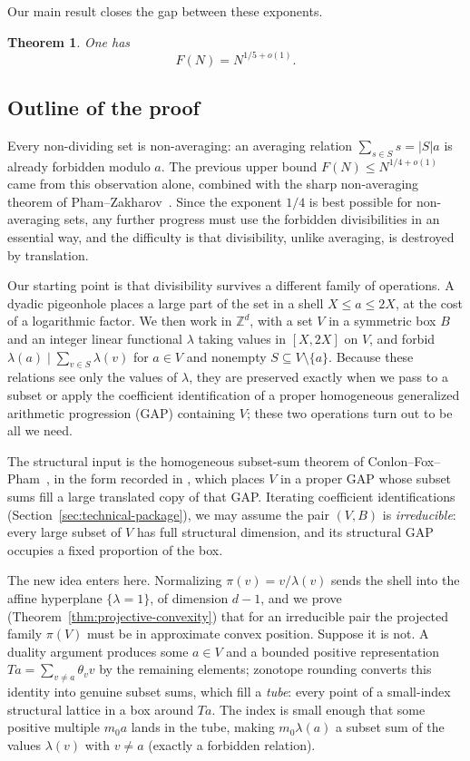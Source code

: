 \documentclass[11pt,reqno]{amsart}
\newtheorem{theorem}{Theorem}[section]
\theoremstyle{definition}
\theoremstyle{remark}
\newcommand{\Z}{\mathbb Z}
\begin{document}
Our main result closes the gap between these exponents.

\begin{theorem}\label{thm:main}
One has
\[
 F(N)=N^{1/5+o(1)}.
\]
\end{theorem}

\subsection{Outline of the proof}

Every non-dividing set is non-averaging: an averaging relation
$\sum_{s\in S}s=|S|a$ is already forbidden modulo $a$.  The previous
upper bound $F(N)\le N^{1/4+o(1)}$ came from this observation alone,
combined with the sharp non-averaging theorem of
Pham--Zakharov~\cite{PhamZakharov}.  Since the exponent $1/4$ is best
possible for non-averaging sets, any further progress must use the
forbidden divisibilities in an essential way, and the difficulty is
that divisibility, unlike averaging, is destroyed by translation.

Our starting point is that divisibility survives a different family of
operations.  A dyadic pigeonhole places a large part of the set in a
shell $X\le a\le2X$, at the cost of a logarithmic factor.  We then work
in $\Z^d$, with a set $V$ in a symmetric box $B$ and an integer linear
functional $\lambda$ taking values in $[X,2X]$ on $V$, and forbid
$\lambda(a)\mid\sum_{v\in S}\lambda(v)$ for $a\in V$ and nonempty
$S\subseteq V\setminus\{a\}$.  Because these relations see only the
values of $\lambda$, they are preserved exactly when we pass to a subset
or apply the coefficient identification of a proper homogeneous
generalized arithmetic progression (GAP) containing $V$; these two
operations turn out to be all we need.

The structural input is the homogeneous subset-sum theorem of
Conlon--Fox--Pham~\cite{CFPHomogeneous}, in the form recorded in
\cite{PhamZakharov}, which places $V$ in a proper GAP whose subset sums
fill a large translated copy of that GAP.  Iterating coefficient
identifications (Section~\ref{sec:technical-package}), we may assume the
pair $(V,B)$ is \emph{irreducible}: every large subset of $V$ has full
structural dimension, and its structural GAP occupies a fixed proportion
of the box.

The new idea enters here.  Normalizing $\pi(v)=v/\lambda(v)$ sends the
shell into the affine hyperplane $\{\lambda=1\}$, of dimension $d-1$,
and we prove (Theorem~\ref{thm:projective-convexity}) that for an
irreducible pair the projected family $\pi(V)$ must be in approximate
convex position.  Suppose it is not.  A duality argument produces some
$a\in V$ and a bounded positive representation
$Ta=\sum_{v\ne a}\theta_vv$ by the remaining elements; zonotope rounding
converts this identity into genuine subset sums, which fill a
\emph{tube}: every point of a small-index structural lattice in a box
around $Ta$.  The index is small enough that some positive multiple
$m_0a$ lands in the tube, making $m_0\lambda(a)$ a subset sum of the
values $\lambda(v)$ with $v\ne a$ (exactly a forbidden relation).
\end{document}
